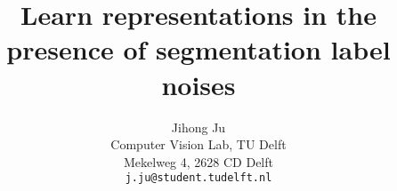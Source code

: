 \documentclass[10pt,twocolumn,letterpaper]{article}
\begin{document}
\onecolumn
{}
% 

\twocolumn
{}
\newpage
\title{Learn representations in the presence of segmentation label noises}

\author{Jihong Ju\\
Computer Vision Lab, TU Delft \\
Mekelweg 4, 2628 CD Delft\\
{\tt\small j.ju@student.tudelft.nl}
}

\maketitle
\end{document}
